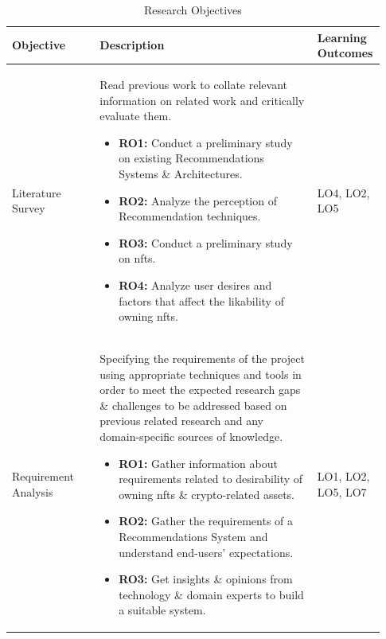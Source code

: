 \documentclass[a4paper, 12pt, oneside]{report}
\begin{document}
\begin{longtable}{| p{0.23\linewidth} | p{0.58\linewidth}| p{0.12\linewidth}|}
\caption{Research Objectives}
\label{tab:research-objectives-table}\\
\hline
Objective &   Description & Learning Outcomes  \\ 
\hline
Literature Survey & Read previous work to collate relevant information on related work and critically evaluate them.
\begin{itemize}
\item \textbf{RO1:} Conduct a preliminary study on existing Recommendations Systems \& Architectures.
\item \textbf{RO2:} Analyze the perception of Recommendation techniques.
\item \textbf{RO3:} Conduct a preliminary study on \Gls{nft}s.
\item \textbf{RO4:} Analyze user desires and factors that affect the likability of owning \Gls{nft}s.
\end{itemize}
& LO4, LO2, LO5 \\
\hline
Requirement Analysis &  Specifying the requirements of the project using appropriate techniques and tools in order to meet the expected research gaps \& challenges to be addressed based on previous related research and any domain-specific sources of knowledge.
\begin{itemize}
\item \textbf{RO1:} Gather information about requirements related to desirability of owning \Gls{nft}s \& crypto-related assets.
\item \textbf{RO2:} Gather the requirements of a Recommendations System and understand end-users' expectations.
\item \textbf{RO3:} Get insights \&  opinions from technology \& domain experts to build a suitable system.
\end{itemize}
& LO1, LO2, LO5, LO7 \\

\end{longtable}
\end{document}
